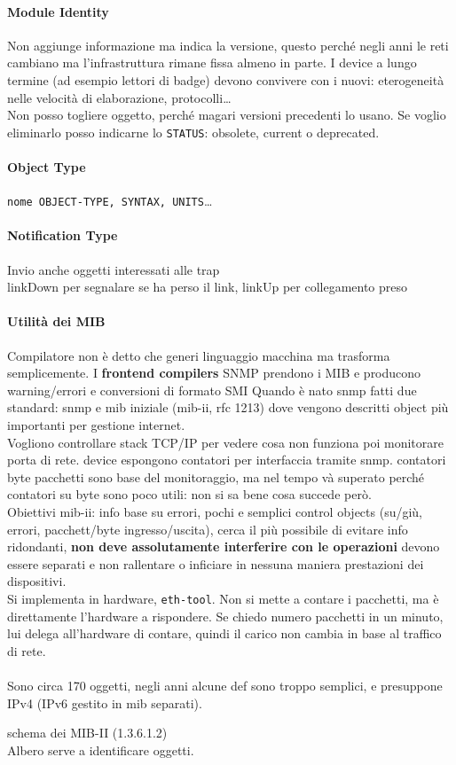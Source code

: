 \documentclass[10pt]{book}
\begin{document}
\paragraph{Module Identity} Non aggiunge informazione ma indica la versione, questo perché negli anni le reti cambiano ma l'infrastruttura rimane fissa almeno in parte. I device a lungo termine (ad esempio lettori di badge) devono convivere con i nuovi: eterogeneità nelle velocità di elaborazione, protocolli\ldots\\
Non posso togliere oggetto, perché magari versioni precedenti lo usano. Se voglio eliminarlo posso indicarne lo \texttt{STATUS}: obsolete, current o deprecated.
\paragraph{Object Type} \texttt{nome OBJECT-TYPE, SYNTAX, UNITS}\ldots
\paragraph{Notification Type} Invio anche oggetti interessati alle trap\\
linkDown per segnalare se ha perso il link, linkUp per collegamento preso
\paragraph{Utilità dei MIB} Compilatore non è detto che generi linguaggio macchina ma trasforma semplicemente. I \textbf{frontend compilers} SNMP prendono i MIB e producono warning/errori e conversioni di formato SMI
Quando è nato snmp fatti due standard: snmp e mib iniziale (mib-ii, rfc 1213) dove vengono descritti object più importanti per gestione internet.\\
Vogliono controllare stack TCP/IP per vedere cosa non funziona poi monitorare porta di rete. device espongono contatori per interfaccia tramite snmp. contatori byte pacchetti sono base del monitoraggio, ma nel tempo và superato perché contatori su byte sono poco utili: non si sa bene cosa succede però. \\
Obiettivi mib-ii: info base su errori, pochi e semplici control objects (su/giù, errori, pacchett/byte ingresso/uscita), cerca il più possibile di evitare info ridondanti, \textbf{non deve assolutamente interferire con le operazioni} devono essere separati e non rallentare o inficiare in nessuna maniera prestazioni dei dispositivi.\\
Si implementa in hardware, \texttt{eth-tool}. Non si mette a contare i pacchetti, ma è direttamente l'hardware a rispondere. Se chiedo numero pacchetti in un minuto, lui delega all'hardware di contare, quindi il carico non cambia in base al traffico di rete.\\\\
Sono circa 170 oggetti, negli anni alcune def sono troppo semplici, e presuppone IPv4 (IPv6 gestito in mib separati).
\begin{center}
	schema dei MIB-II (1.3.6.1.2)\\
	Albero serve a identificare oggetti.
\end{center}
\end{document}
